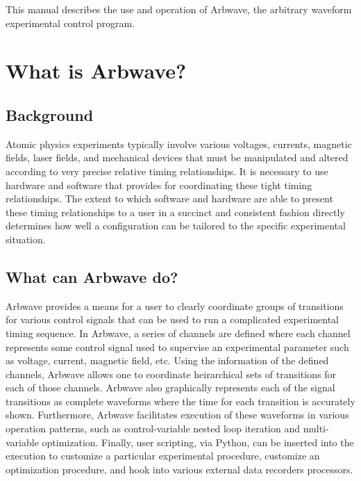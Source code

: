 \thispagestyle{fancy}
\pagestyle{fancy}

This manual describes the use and operation of Arbwave, the arbitrary waveform
experimental control program.

\section{What is Arbwave?}
\subsection{Background}
Atomic physics experiments typically involve various voltages, currents,
magnetic fields, laser fields, and mechanical devices that must be manipulated
and altered according to very precise relative timing relationships.  It is
necessary to use hardware and software that provides for coordinating these
tight timing relationships.  The extent to which software and hardware are
able to present these timing relationships to a user in a succinct and
consistent fashion directly determines how well a configuration can be
tailored to the specific experimental situation.

\subsection{What can Arbwave do?}
Arbwave provides a means for a user to clearly coordinate groups of transitions
for various control signals that can be used to run a complicated experimental
timing sequence.  In Arbwave, a series of channels are defined where each
channel represents some control signal used to supervise an experimental
parameter such as voltage, current, magnetic field, etc.  Using the
information of the defined channels, Arbwave allows one to coordinate
heirarchical sets of transitions for each of those channels.  Arbwave also
graphically represents each of the signal transitions as complete waveforms
where the time for each transition is accurately shown.  Furthermore, Arbwave
facilitates execution of these waveforms in various operation patterns, such
as control-variable nested loop iteration and multi-variable optimization.
Finally, user scripting, via Python, can be inserted into the execution to
customize a particular experimental procedure, customize an optimization
procedure, and hook into various external data recorders processors.



